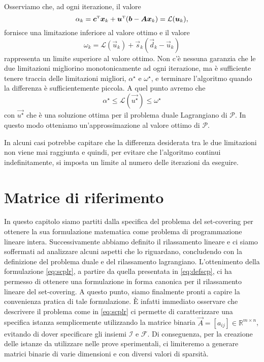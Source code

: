 \noindent
Osserviamo che, ad ogni iterazione, il valore
\begin{equation}
    \alpha_k = \bm{c}^{\scriptscriptstyle\mathrm{T}}\bm{x}_k +
    \bm{u}^{\scriptscriptstyle\mathrm{T}}(\bm{b}-\bm{A}\bm{x}_k) = \mathcal{L}(\bm{u}_k),
\end{equation}
fornisce una limitazione inferiore al valore ottimo e il valore
\begin{equation}
   \omega_k = \mathcal{L}(\vec{u}_k) + \vec{s}_k(\vec{d}_k - \vec{u}_k)
\end{equation}
rappresenta un limite superiore al valore ottimo. Non c'è nessuna garanzia che le due limitazioni migliorino
monotonicamente ad ogni iterazione, ma è sufficiente tenere traccia delle limitazioni migliori, \( \alpha^{\star} \) e
\( \omega^{\star} \), e terminare l'algoritmo quando la differenza è sufficientemente piccola. A quel punto avremo che
\begin{equation}
    \alpha^{\star} \leq \mathcal{L}(\vec{u^{\star}}) \leq \omega^{\star}
\end{equation}
con \( \vec{u^{\star}} \) che è una soluzione ottima per il problema duale Lagrangiano di \( \mathcal{P} \). In questo
modo otteniamo un'approssimazione al valore ottimo di \( \mathcal{P} \).

In alcuni casi potrebbe capitare che la differenza desiderata tra le due limitazioni non viene mai raggiunta e quindi,
per evitare che l'algoritmo continui indefinitamente, si imposta un limite al numero delle iterazioni da eseguire.

\section{Matrice di riferimento} \label{sec:refmat}
In questo capitolo siamo partiti dalla specifica del problema del set-covering per ottenere la sua
formulazione matematica come problema di programmazione lineare intera. Successivamente abbiamo definito il rilassamento
lineare e ci siamo soffermati ad analizzare alcuni aspetti che lo riguardano, concludendo con la definizione del
problema duale e del rilassamento lagrangiano. L'ottenimento della formulazione \eqref{eq:scplr}, a partire da quella
presentata in \eqref{eq:defscp}, ci ha permesso di ottenere una formulazione in forma canonica per il rilassamento
lineare del set-covering. A questo punto, siamo finalmente pronti a capire la convenienza pratica di tale formulazione.
\`E infatti immediato osservare che descrivere il problema come in \eqref{eq:scplr} ci permette di caratterizzare una
specifica istanza semplicemente utilizzando la matrice binaria \( \vec{A} = [a_{ij}] \in \mathbb{R}^{m\times n}\),
evitando di dover specificare gli insiemi \( \mathcal{I} \) e \( \mathcal{F} \). Di conseguenza, per la creazione delle
istanze da utilizzare nelle prove sperimentali, ci limiteremo a generare matrici binarie di varie dimensioni e con
diversi valori di sparsità.

